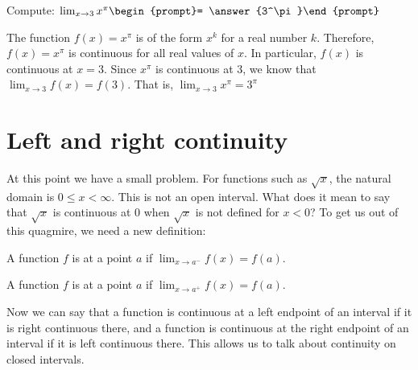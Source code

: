 \documentclass{ximera}
\begin{document}
\begin{question}
  Compute:
  $\lim_{x\to 3} x^\pi \begin{prompt}= \answer{3^\pi}\end{prompt}$
  \begin{feedback}
    The function $f(x)=x^\pi$ is of the form $x^k$ for a real number
    $k$.  Therefore, $f(x)=x^\pi$ is continuous for all real values of
    $x$.  In particular, $f(x)$ is continuous at $x=3$.  Since $x^\pi$
    is continuous at $3$, we know that $\lim_{x\to 3} f(x) = f(3)$.
    That is, $\lim_{x\to 3} x^\pi = 3^\pi$
  \end{feedback}  
\end{question}

\section{Left and right continuity}


At this point we have a small problem.  For functions such as
$\sqrt{x}$, the natural domain is $0\leq x <\infty$.  This is not an
open interval.  What does it mean to say that $\sqrt{x}$ is continuous
at $0$ when $\sqrt{x}$ is not defined for $x<0$? To get us out of this
quagmire, we need a new definition:

\begin{definition}
  A function $f$ is  at a point $a$ if
  $\lim_{x\to a^-} f(x) = f(a)$.

  A function $f$ is  at a point $a$ if
  $\lim_{x\to a^+} f(x) = f(a)$.
\end{definition}

Now we can say that a function is continuous at a left endpoint of an
interval if it is right continuous there, and a function is continuous
at the right endpoint of an interval if it is left continuous
there. This allows us to talk about continuity on closed intervals.
\end{document}
